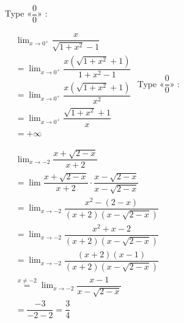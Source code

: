 {\begin{tasks}
\task Type «$ \dfrac{0}{0} $» :  

\(
\begin{aligned}
&\lim_{x \to 0^+} \dfrac{x}{\sqrt{1 + x^2} - 1}\\
&= \lim_{x \to 0^+} \dfrac{x(\sqrt{1 + x^2} + 1)}{1 + x^2 - 1} \\
&= \lim_{x \to 0^+} \dfrac{x(\sqrt{1 + x^2} + 1)}{x^2} \\
&= \lim_{x \to 0^+} \dfrac{\sqrt{1 + x^2} + 1}{x}\\
&=+\infty
\end{aligned}
\)
\task Type «$ \dfrac{0}{0} $» :  

\(
\begin{aligned}
&\lim_{x \to -2} \dfrac{x + \sqrt{2 - x}}{x + 2}\\
&= \lim \dfrac{x + \sqrt{2 - x}}{x + 2} \cdot \dfrac{x - \sqrt{2 - x}}{x - \sqrt{2 - x}} \\
&= \lim_{x\to-2} \dfrac{x^2 - (2 - x)}{(x + 2)(x - \sqrt{2 - x})} \\
&= \lim_{x\to-2}\dfrac{x^2 + x - 2}{(x + 2)(x - \sqrt{2 - x})} \\
&= \lim_{x\to-2}\dfrac{(x + 2)(x - 1)}{(x + 2)(x - \sqrt{2 - x})} \\
&\stackrel{x \ne -2}{=} \lim_{x\to-2} \dfrac{x - 1}{x - \sqrt{2 - x}} \\
&= \dfrac{-3}{-2 - 2} = \dfrac{3}{4}
\end{aligned}
\)
\end{tasks}

}

